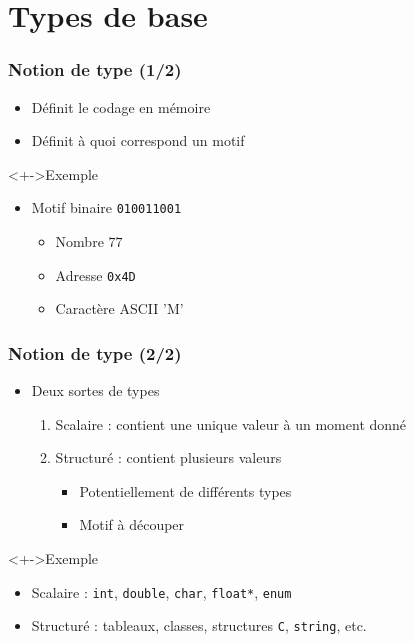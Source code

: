 \section{Types de base}

\begin{frame}
\frametitle{Notion de type (1/2)}
\begin{itemize}[<+->]
\item Définit le codage en mémoire
\item Définit à quoi correspond un motif
\end{itemize}
\begin{exampleblock}<+->{Exemple}
	\begin{itemize}[<+->]
	\item Motif binaire \texttt{010011001}
		\begin{itemize}
		\item Nombre $77$
		\item Adresse \texttt{0x4D}
		\item Caractère ASCII 'M'
		\end{itemize}
	\end{itemize}
\end{exampleblock}
\end{frame}

\begin{frame}
\frametitle{Notion de type (2/2)}
\begin{itemize}[<+->]
\item Deux sortes de types
	\begin{enumerate}
	\item Scalaire : contient une unique valeur à un moment donné
	\item Structuré : contient plusieurs valeurs
		\begin{itemize}
		\item Potentiellement de différents types
		\item Motif à découper
		\end{itemize}
	\end{enumerate}
\end{itemize}
\begin{exampleblock}<+->{Exemple}
	\begin{itemize}
	\item Scalaire : \lstinline|int|, \lstinline|double|, \lstinline|char|, \lstinline|float*|, \lstinline|enum|
	\item Structuré : tableaux, classes, structures \texttt{C}, \texttt{string}, etc.
	\end{itemize}
\end{exampleblock}
\end{frame}

